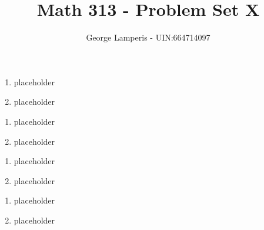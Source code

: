 \documentclass[12pt, letterpaper]{article}
\begin{document}
\title{Math 313 - Problem Set X\vspace{-2ex}}	%
\author{George Lamperis - UIN:664714097} 		
\date{\vspace{-2ex}}
\maketitle


\begin{enumerate}[label=\bfseries1\alph*)]

\item placeholder
\item placeholder

\end{enumerate}

\begin{enumerate}[label=\bfseries2\alph*)]

\item placeholder
\item placeholder

\end{enumerate}

\begin{enumerate}[label=\bfseries3\alph*)]

\item placeholder
\item placeholder

\end{enumerate}

\begin{enumerate}[label=\bfseries4\alph*)]

\item placeholder
\item placeholder

\end{enumerate}


\end{document}
